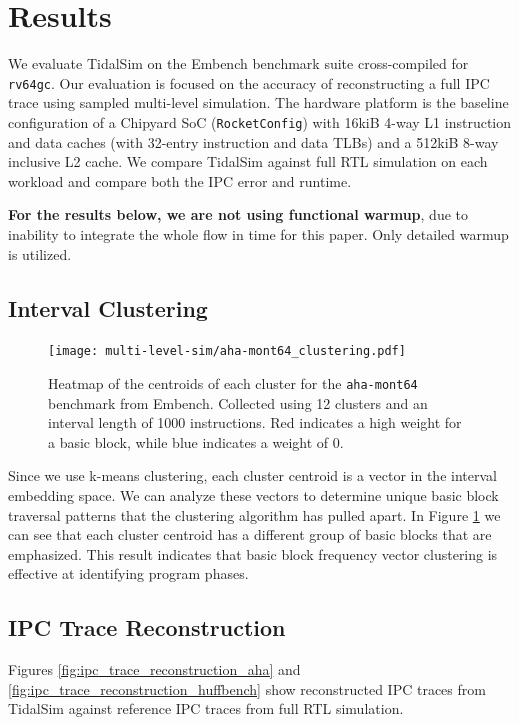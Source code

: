\documentclass[sigplan,nonacm,10pt]{acmart}
\begin{document}
\section{Results}

We evaluate TidalSim on the Embench benchmark suite\cite{embench} cross-compiled for \texttt{rv64gc}.
Our evaluation is focused on the accuracy of reconstructing a full IPC trace using sampled multi-level simulation.
The hardware platform is the baseline configuration of a Chipyard SoC (\texttt{RocketConfig}) with 16kiB 4-way L1 instruction and data caches (with 32-entry instruction and data TLBs) and a 512kiB 8-way inclusive L2 cache.
We compare TidalSim against full RTL simulation on each workload and compare both the IPC error and runtime.

\textbf{For the results below, we are not using functional warmup}, due to inability to integrate the whole flow in time for this paper.
Only detailed warmup is utilized.

\subsection{Interval Clustering}

\begin{figure}
  \texttt{[image: multi-level-sim/aha-mont64\_clustering.pdf]}
  \caption{Heatmap of the centroids of each cluster for the \texttt{aha-mont64} benchmark from Embench. Collected using 12 clusters and an interval length of 1000 instructions. Red indicates a high weight for a basic block, while blue indicates a weight of 0.}
  \label{fig:interval_clustering}
\end{figure}

Since we use k-means clustering, each cluster centroid is a vector in the interval embedding space.
We can analyze these vectors to determine unique basic block traversal patterns that the clustering algorithm has pulled apart.
In Figure \ref{fig:interval_clustering} we can see that each cluster centroid has a different group of basic blocks that are emphasized.
This result indicates that basic block frequency vector clustering is effective at identifying program phases.

\subsection{IPC Trace Reconstruction}

Figures \ref{fig:ipc_trace_reconstruction_aha} and \ref{fig:ipc_trace_reconstruction_huffbench} show reconstructed IPC traces from TidalSim against reference IPC traces from full RTL simulation.
\end{document}
